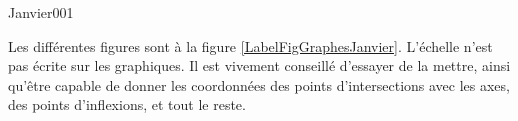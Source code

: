 \begin{corrige}{Janvier001}

\newcommand{\CaptionFigGraphesJanvier}{Correction figures. Attention : tous les graphes ne sont pas à la même échelle.}


Les différentes figures sont à la figure \ref{LabelFigGraphesJanvier}. L'échelle n'est pas écrite sur les graphiques. Il est vivement conseillé d'essayer de la mettre, ainsi qu'être capable de donner les coordonnées des points d'intersections avec les axes, des points d'inflexions, et tout le reste.


\end{corrige}
